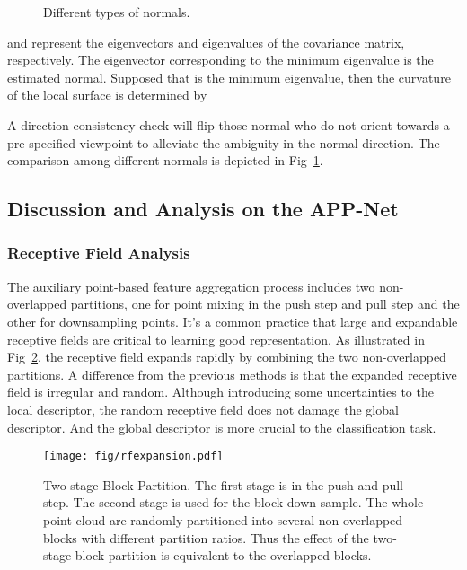 \documentclass[journal]{IEEEtran}
\begin{document}
\begin{figure}[tbp]
\begin{center}
\end{center}
\vspace{-0.3cm}
   \caption{Different types of normals.}
\label{fig:normal}
\end{figure}






\noindent
 and  represent the eigenvectors and eigenvalues of the covariance matrix, respectively. The eigenvector  corresponding to the minimum eigenvalue is the estimated normal. Supposed that  is the minimum eigenvalue, then the curvature  of the local surface is determined by 





A direction consistency check will flip those normal who do not orient towards a pre-specified viewpoint  to alleviate the ambiguity in the normal direction. The comparison among different normals is depicted in Fig~\ref{fig:normal}.

\subsection{Discussion and Analysis on the APP-Net}
\subsubsection{Receptive Field Analysis}

The auxiliary point-based feature aggregation process includes two non-overlapped partitions, one for point mixing in the push step and pull step and the other for downsampling points. It's a common practice that large and expandable receptive fields are critical to learning good representation. As illustrated in Fig~\ref{fig:receptivefield}, the receptive field expands rapidly by combining the two non-overlapped partitions. A difference from the previous methods is that the expanded receptive field is irregular and random. Although introducing some uncertainties to the local descriptor, the random receptive field does not damage the global descriptor. And the global descriptor is more crucial to the classification task.

\begin{figure}[tbp]
\begin{center}
\texttt{[image: fig/rfexpansion.pdf]}
\end{center}
\vspace{-0.5cm}
   \caption{Two-stage Block Partition. The first stage is in the push and pull step. The second stage is used for the block down sample. The whole point cloud are randomly partitioned into several non-overlapped blocks with different partition ratios. Thus the effect of the two-stage block partition is equivalent to the overlapped blocks.}
   \label{fig:receptivefield}
\end{figure}
\end{document}
